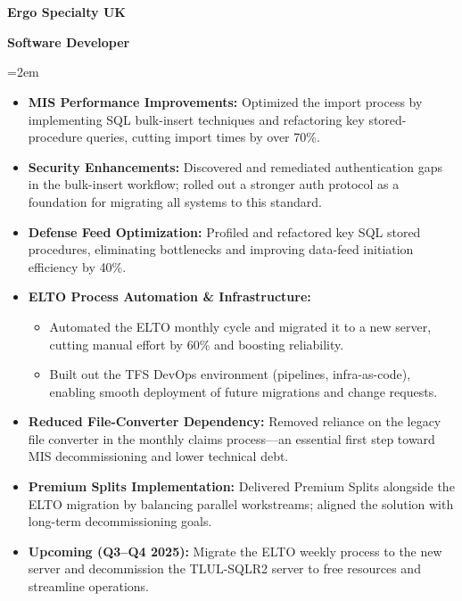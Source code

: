 \documentclass[paper=a4,fontsize=12pt]{article} %
\newcommand{\sepspace}{\vspace*{1em}}
\newcommand{\NewPart}[1]{\section*{\text{#1}}}
\newcommand{\EducationEntry}[4]{
		\noindent \textbf{#1} \hfill      %
		\colorbox{White}{%
			\parbox{6em}{%
			\hfill\color{Black}#2}} \par  %
		\noindent \textbf{#3} \par        %
		\noindent\hangindent=2em\hangafter=0 \small #4 %
		\normalsize \par}
\begin{document}
\sepspace

	

\NewPart{Employment}{}

\EducationEntry{Ergo Specialty UK}{\textbf{\hspace{-2cm}{August2024–Present}}}{Software Developer}{
    \begin{itemize}
        \itemsep-0.1em 
        \item \textbf{MIS Performance Improvements:} Optimized the import process by implementing SQL bulk-insert techniques and refactoring key stored-procedure queries, cutting import times by over 70\%.
        \item \textbf{Security Enhancements:} Discovered and remediated authentication gaps in the bulk-insert workflow; rolled out a stronger auth protocol as a foundation for migrating all systems to this standard.
        \item \textbf{Defense Feed Optimization:} Profiled and refactored key SQL stored procedures, eliminating bottlenecks and improving data-feed initiation efficiency by 40\%.
        \item \textbf{ELTO Process Automation \& Infrastructure:}
            \begin{itemize}
                \item Automated the ELTO monthly cycle and migrated it to a new server, cutting manual effort by 60\% and boosting reliability.
                \item Built out the TFS DevOps environment (pipelines, infra-as-code), enabling smooth deployment of future migrations and change requests.
            \end{itemize}
        \item \textbf{Reduced File-Converter Dependency:} Removed reliance on the legacy file converter in the monthly claims process—an essential first step toward MIS decommissioning and lower technical debt.
        \item \textbf{Premium Splits Implementation:} Delivered Premium Splits alongside the ELTO migration by balancing parallel workstreams; aligned the solution with long-term decommissioning goals.
        \item \textbf{Upcoming (Q3–Q4 2025):} Migrate the ELTO weekly process to the new server and decommission the TLUL-SQLR2 server to free resources and streamline operations.
    \end{itemize}
}
\end{document}
